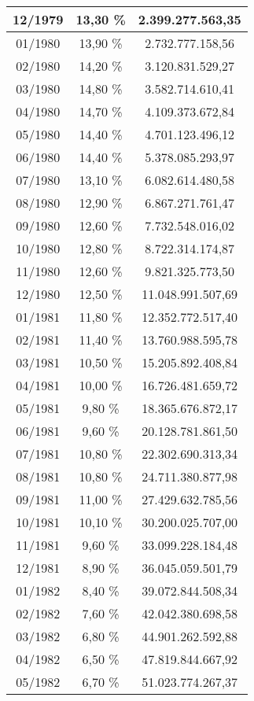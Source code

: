 \begin{center}
\begin{longtable}{|c|c|c|}
12/1979 & 13,30 \% & 2.399.277.563,35 \\ \hline
01/1980 & 13,90 \% & 2.732.777.158,56 \\ \hline
02/1980 & 14,20 \% & 3.120.831.529,27 \\ \hline
03/1980 & 14,80 \% & 3.582.714.610,41 \\ \hline
04/1980 & 14,70 \% & 4.109.373.672,84 \\ \hline
05/1980 & 14,40 \% & 4.701.123.496,12 \\ \hline
06/1980 & 14,40 \% & 5.378.085.293,97 \\ \hline
07/1980 & 13,10 \% & 6.082.614.480,58 \\ \hline
08/1980 & 12,90 \% & 6.867.271.761,47 \\ \hline
09/1980 & 12,60 \% & 7.732.548.016,02 \\ \hline
10/1980 & 12,80 \% & 8.722.314.174,87 \\ \hline
11/1980 & 12,60 \% & 9.821.325.773,50 \\ \hline
12/1980 & 12,50 \% & 11.048.991.507,69 \\ \hline
01/1981 & 11,80 \% & 12.352.772.517,40 \\ \hline
02/1981 & 11,40 \% & 13.760.988.595,78 \\ \hline
03/1981 & 10,50 \% & 15.205.892.408,84 \\ \hline
04/1981 & 10,00 \% & 16.726.481.659,72 \\ \hline
05/1981 & 9,80 \% & 18.365.676.872,17 \\ \hline
06/1981 & 9,60 \% & 20.128.781.861,50 \\ \hline
07/1981 & 10,80 \% & 22.302.690.313,34 \\ \hline
08/1981 & 10,80 \% & 24.711.380.877,98 \\ \hline
09/1981 & 11,00 \% & 27.429.632.785,56 \\ \hline
10/1981 & 10,10 \% & 30.200.025.707,00 \\ \hline
11/1981 & 9,60 \% & 33.099.228.184,48 \\ \hline
12/1981 & 8,90 \% & 36.045.059.501,79 \\ \hline
01/1982 & 8,40 \% & 39.072.844.508,34 \\ \hline
02/1982 & 7,60 \% & 42.042.380.698,58 \\ \hline
03/1982 & 6,80 \% & 44.901.262.592,88 \\ \hline
04/1982 & 6,50 \% & 47.819.844.667,92 \\ \hline
05/1982 & 6,70 \% & 51.023.774.267,37 \\ \hline

\end{longtable}
\end{center}

